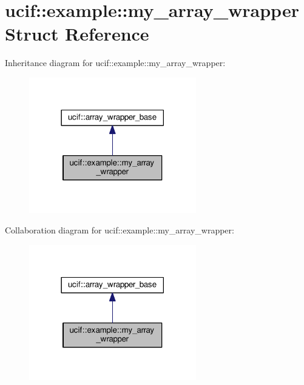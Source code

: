 \hypertarget{structucif_1_1example_1_1my__array__wrapper}{\section{ucif\-:\-:example\-:\-:my\-\_\-array\-\_\-wrapper Struct Reference}
\label{structucif_1_1example_1_1my__array__wrapper}
}


Inheritance diagram for ucif\-:\-:example\-:\-:my\-\_\-array\-\_\-wrapper\-:
\nopagebreak
\begin{figure}[H]
\begin{center}
\leavevmode
\includegraphics[width=206pt]{structucif_1_1example_1_1my__array__wrapper__inherit__graph}
\end{center}
\end{figure}


Collaboration diagram for ucif\-:\-:example\-:\-:my\-\_\-array\-\_\-wrapper\-:
\nopagebreak
\begin{figure}[H]
\begin{center}
\leavevmode
\includegraphics[width=206pt]{structucif_1_1example_1_1my__array__wrapper__coll__graph}
\end{center}
\end{figure}
